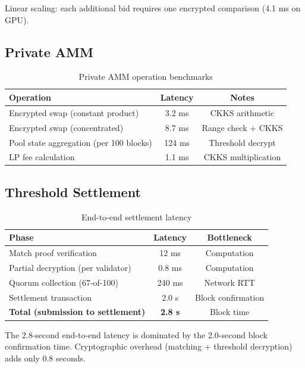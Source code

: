 Linear scaling: each additional bid requires one encrypted comparison (4.1 ms on GPU).

\subsection{Private AMM}

\begin{table}[h]
\centering
\begin{tabular}{lcc}
\toprule
\textbf{Operation} & \textbf{Latency} & \textbf{Notes} \\
\midrule
Encrypted swap (constant product) & 3.2 ms & CKKS arithmetic \\
Encrypted swap (concentrated) & 8.7 ms & Range check + CKKS \\
Pool state aggregation (per 100 blocks) & 124 ms & Threshold decrypt \\
LP fee calculation & 1.1 ms & CKKS multiplication \\
\bottomrule
\end{tabular}
\caption{Private AMM operation benchmarks}
\label{tab:amm_bench}
\end{table}

\subsection{Threshold Settlement}

\begin{table}[h]
\centering
\begin{tabular}{lcc}
\toprule
\textbf{Phase} & \textbf{Latency} & \textbf{Bottleneck} \\
\midrule
Match proof verification & 12 ms & Computation \\
Partial decryption (per validator) & 0.8 ms & Computation \\
Quorum collection (67-of-100) & 240 ms & Network RTT \\
Settlement transaction & 2.0 s & Block confirmation \\
\midrule
\textbf{Total (submission to settlement)} & \textbf{2.8 s} & Block time \\
\bottomrule
\end{tabular}
\caption{End-to-end settlement latency}
\label{tab:settlement_bench}
\end{table}

The 2.8-second end-to-end latency is dominated by the 2.0-second block confirmation time. Cryptographic overhead (matching + threshold decryption) adds only 0.8 seconds.

